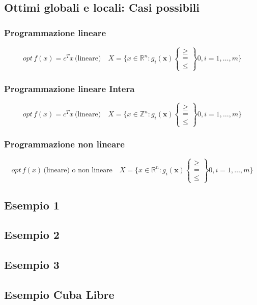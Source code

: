         \subsection{Ottimi globali e locali: Casi possibili}

        \subsubsection{Programmazione lineare}
        {
            \large

            $$
                opt\, f(x) = c^Tx\, \text{(lineare)} \quad X = \{x \in \mathbb{R}^n :  
                g_i(\mathbf{x}) 
                \begin{Bmatrix} 
                    \ge \\ = \\ \le 
                \end{Bmatrix} 0, i=1,\dots,m
                    \}
            $$
        }

        \subsubsection{Programmazione lineare Intera}
        {
            \large

            $$
                opt\, f(x) = c^Tx\, \text{(lineare)} \quad X = \{x \in \mathbb{Z}^n :  
                g_i(\mathbf{x}) 
                \begin{Bmatrix} 
                    \ge \\ = \\ \le 
                \end{Bmatrix} 0, i=1,\dots,m
                    \}
            $$
        }

        \subsubsection{Programmazione non lineare}
        {
            \large

            $$
                opt\, f(x)\, \text{(lineare) o non lineare} \quad X = \{x \in \mathbb{R}^n :  
                g_i(\mathbf{x}) 
                \begin{Bmatrix} 
                    \ge \\ = \\ \le 
                \end{Bmatrix} 0, i=1,\dots,m
                    \}
            $$
        }

        \subsection{Esempio 1}

        \subsection{Esempio 2}

        \subsection{Esempio 3}

        \subsection{Esempio Cuba Libre}